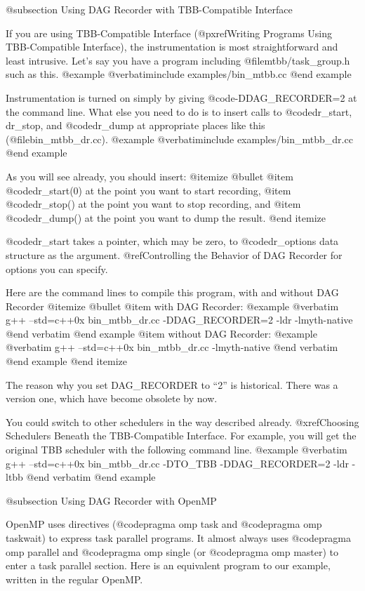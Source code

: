 @subsection Using DAG Recorder with TBB-Compatible Interface

If you are using TBB-Compatible Interface (@pxref{Writing Programs Using TBB-Compatible Interface}), the instrumentation is most straightforward and least intrusive.  Let's say you have a program including @file{mtbb/task_group.h} such as this.
@example
@verbatiminclude examples/bin_mtbb.cc
@end example

Instrumentation is turned on simply by giving @code{-DDAG_RECORDER=2} at the command line.  What else you need to do is to insert calls to @code{dr_start, dr_stop,} and @code{dr_dump} at appropriate places like this  (@file{bin_mtbb_dr.cc}).
@example
@verbatiminclude examples/bin_mtbb_dr.cc
@end example

As you will see already, you should insert:
@itemize @bullet
@item @code{dr_start(0)} at the point you want to start recording,
@item @code{dr_stop()} at the point you want to stop recording, and
@item @code{dr_dump()} at the point you want to dump the result.
@end itemize

@code{dr_start} takes a pointer, which may be zero, to @code{dr_options} data structure as the argument.  
@ref{Controlling the Behavior of DAG Recorder} for options you can specify.

Here are the command lines to compile this program, with and without DAG Recorder
@itemize @bullet
@item with DAG Recorder:
@example
@verbatim
g++ --std=c++0x bin_mtbb_dr.cc -DDAG_RECORDER=2 -ldr -lmyth-native 
@end verbatim
@end example
@item without DAG Recorder:
@example
@verbatim
g++ --std=c++0x bin_mtbb_dr.cc -lmyth-native
@end verbatim
@end example
@end itemize

The reason why you set DAG_RECORDER to ``2'' is historical.  There was a version one, which have become obsolete by now.

You could switch to other schedulers in the way described already. @xref{Choosing Schedulers Beneath the TBB-Compatible Interface}.  For example, you will get the original TBB scheduler with the following command line.
@example
@verbatim
g++ --std=c++0x bin_mtbb_dr.cc -DTO_TBB -DDAG_RECORDER=2 -ldr -ltbb 
@end verbatim
@end example

@subsection Using DAG Recorder with OpenMP

OpenMP uses directives (@code{pragma omp task} and @code{pragma omp
taskwait}) to express task parallel programs.  It almost always uses
@code{pragma omp parallel} and @code{pragma omp single} (or @code{pragma
omp master}) to enter a task parallel section.  Here is an equivalent
program to our example, written in the regular OpenMP.

